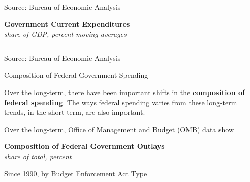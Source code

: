 \documentclass{report}
\newcommand{\tbllink}[1]{\href{https://raw.githubusercontent.com/bdecon/US-chartbook/master/chartbook/data/#1}{\faTable}}
\begin{document}
{\begin{minipage}{1.0\textwidth}
\footnotesize{Source: Bureau of Economic Analysis} \hfill \tbllink{gov_exp_overview.csv}
\vspace{1mm}

\small   
\vspace{1mm}

\normalsize \textbf{Government Current Expenditures}\\
\footnotesize{\textit{share of GDP, percent \hspace{63mm} moving averages}}\\ 
 \setlength{\tabcolsep}{4pt} \color{black!90}
	{\renewcommand{\arraystretch}{1.54}
\hspace{-2mm} \begin{tabular}{p{36mm} R{7mm} R{7mm} R{7mm} R{7mm} R{7mm} |
		   R{7mm} R{7mm} R{7mm} }
			  \hline
		\end{tabular}}\vspace{-2mm}
		
\footnotesize{Source: Bureau of Economic Analysis}
\end{minipage}
\newpage
\vspace*{-10mm}

\begin{minipage}{1.0\textwidth}  
\normalsize Composition of Federal Government Spending
\vspace{-1mm}

\small Over the long-term, there have been important shifts in the \textbf{composition of federal spending}. The ways federal spending varies from these long-term trends, in the short-term, are also important. 

Over the long-term, Office of Management and Budget (OMB) data \href{https://www.whitehouse.gov/omb/historical-tables/}{show} 
\vspace{1mm}

\normalsize \textbf{Composition of Federal Government Outlays}\\
\footnotesize{\textit{share of total, percent}}
\vspace{1mm}

\begin{minipage}{0.58\textwidth}
\small {Since 1990, by Budget Enforcement Act Type}\\
\vspace{5.0cm}


\end{minipage}
\end{minipage}}
\end{document}

